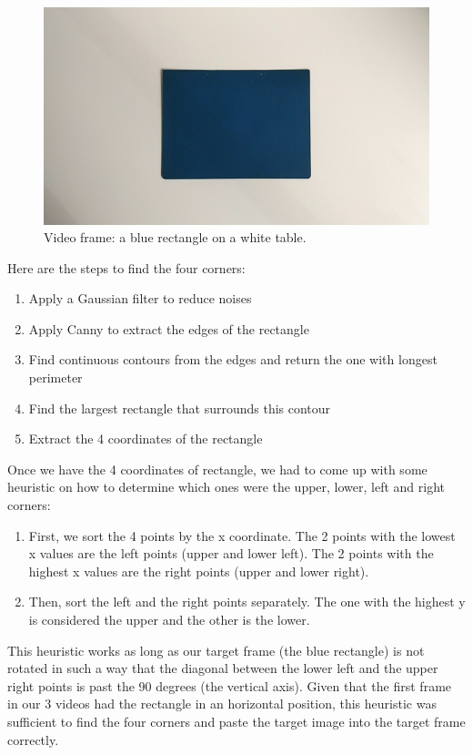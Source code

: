 \documentclass[]{IEEEtran}
\begin{document}
\begin{figure}[h]
  \includegraphics[width=\linewidth]{./figures/augmentation/simple.jpg}
  \caption{Video frame: a blue rectangle on a white table.}
  \label{fig:simple}
\end{figure}

Here are the steps to find the four corners:
\begin{enumerate}
    \item Apply a Gaussian filter to reduce noises
    \item Apply Canny to extract the edges of the rectangle
    \item Find continuous contours from the edges and return the one with longest perimeter
    \item Find the largest rectangle that surrounds this contour
    \item Extract the 4 coordinates of the rectangle
\end{enumerate}

Once we have the 4 coordinates of rectangle, we had to come up with some heuristic on how to determine which ones were the upper, lower, left and right corners:
\begin{enumerate}
\item First, we sort the 4 points by the x coordinate. The 2 points with the lowest x values are the left points (upper and lower left). The 2 points with the highest x values are the right points (upper and lower right).
\item Then, sort the left and the right points separately. The one with the highest y is considered the upper and the other is the lower.
\end{enumerate}

This heuristic works as long as our target frame (the blue rectangle) is not rotated in such a way that the diagonal between the lower left and the upper right points is past the 90 degrees (the vertical axis). Given that the first frame in our 3 videos had the rectangle in an horizontal position, this heuristic was sufficient to find the four corners and paste the target image into the target frame correctly.
\end{document}
